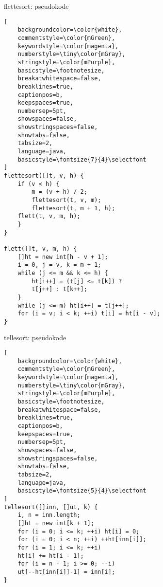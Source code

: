 \documentclass[10pt,a4paper]{article}
\begin{document}
\begin{multicols}{4}
{\noindent
\color{red}flettesort:\color{black}
pseudokode
\noindent
\begin{lstlisting}[
    backgroundcolor=\color{white},   
    commentstyle=\color{mGreen},
    keywordstyle=\color{magenta},
    numberstyle=\tiny\color{mGray},
    stringstyle=\color{mPurple},
    basicstyle=\footnotesize,
    breakatwhitespace=false,         
    breaklines=true,                 
    captionpos=b,                    
    keepspaces=true,                 
    numbersep=5pt,                  
    showspaces=false,                
    showstringspaces=false,
    showtabs=false,                  
    tabsize=2,
    language=java,
    basicstyle=\fontsize{7}{4}\selectfont
]
flettesort([]t, v, h) {
    if (v < h) {
        m = (v + h) / 2;
        flettesort(t, v, m);
        flettesort(t, m + 1, h);
    flett(t, v, m, h);
    }
}

flett([]t, v, m, h) {
    []ht = new int[h - v + 1];
    i = 0, j = v, k = m + 1;
    while (j <= m && k <= h) {
        ht[i++] = (t[j] <= t[k]) ?
        t[j++] : t[k++];
    }
    while (j <= m) ht[i++] = t[j++];
    for (i = v; i < k; ++i) t[i] = ht[i - v];
}
\end{lstlisting}

\noindent
\color{red}tellesort:\color{black}
pseudokode
\noindent
\begin{lstlisting}[
    backgroundcolor=\color{white},   
    commentstyle=\color{mGreen},
    keywordstyle=\color{magenta},
    numberstyle=\tiny\color{mGray},
    stringstyle=\color{mPurple},
    basicstyle=\footnotesize,
    breakatwhitespace=false,         
    breaklines=true,                 
    captionpos=b,                    
    keepspaces=true,                 
    numbersep=5pt,                  
    showspaces=false,                
    showstringspaces=false,
    showtabs=false,                  
    tabsize=2,
    language=java,
    basicstyle=\fontsize{5}{4}\selectfont
]
tellesort([]inn, []ut, k) {
    i, n = inn.length;
    []ht = new int[k + 1];
    for (i = 0; i <= k; ++i) ht[i] = 0;
    for (i = 0; i < n; ++i) ++ht[inn[i]];
    for (i = 1; i <= k; ++i)
    ht[i] += ht[i - 1];
    for (i = n - 1; i >= 0; --i)
    ut[--ht[inn[i]]-1] = inn[i];
}
\end{lstlisting}


}
\end{multicols}
\end{document}
